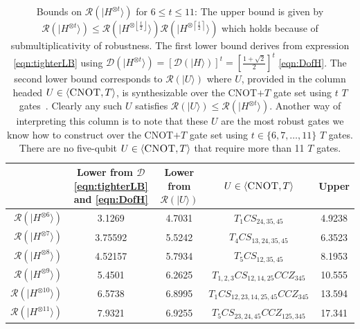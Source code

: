 \documentclass[aps,prl,twocolumn,showpacs,superscriptaddress,groupedaddress,amsmath,amssymb]{revtex4-1}  %
\def\ket #1{\vert #1\rangle}
\begin{document}
\begin{table}[t]
\centering
\begin{tabular}{rcccc}
\hline
 &\hspace{0.25cm} Lower from $\mathcal{D}$ \eqref{eqn:tighterLB} and \eqref{eqn:DofH} \hspace{0.25cm} &  Lower from $\mathcal{R}(\ket{U})$  & $U\in\langle \textsc{CNOT}, T\rangle$ & Upper  \\
\hline
$\mathcal{R}(\ket{H^{\otimes 6}})$ \quad & 3.1269 & 4.7031 & $T_1CS_{24,35,45}$ & 4.9238\\
$\mathcal{R}(\ket{H^{\otimes 7}})$ \quad  & 3.75592 & 5.5242 & $T_4CS_{13,24,35,45}$ & 6.3523  \\
$\mathcal{R}(\ket{H^{\otimes 8}})$ \quad  & 4.52157 & 5.7934 & $T_5CS_{12,35,45}$ & 8.1953 \\
$\mathcal{R}(\ket{H^{\otimes 9}})$ \quad  & 5.4501 & 6.2625 & $T_{1,2,3}CS_{12,14,25}CCZ_{345}$            & 10.555 \\
$\mathcal{R}(\ket{H^{\otimes 10}})$ \quad  & 6.5738 & 6.8995 & $T_{1}CS_{12,23,14,25,45}CCZ_{345}$              & 13.594 \\
$\mathcal{R}(\ket{H^{\otimes 11}})$ \quad  & 7.9321 & 6.9255 & $T_5CS_{23,24,45}CCZ_{125,345}$              & 17.341 \\
\hline
\end{tabular}
\caption{\label{Tab:bounds_on_Rob} Bounds on $\mathcal{R}(\ket{H^{\otimes t}})$ for $6\leq t \leq 11$: The upper bound is given by $\mathcal{R}(\ket{H^{\otimes t}})\leq \mathcal{R}(\ket{H^{\otimes \left \lfloor{\tfrac{t}{2}}\right \rfloor}})\mathcal{R}(\ket{H^{\otimes \left \lceil{\tfrac{t}{2}}\right \rceil}})$ which holds because of submultiplicativity of robustness. The first lower bound derives from expression \eqref{eqn:tighterLB} using $\mathcal{D}(\ket{H^{\otimes t}})=\left[\mathcal{D}(\ket{H})\right]^{ t}=\left[\frac{1+\sqrt{2}}{2}\right]^t$ \eqref{eqn:DofH}. The second lower bound corresponds to $\mathcal{R}(\ket{U})$ where $U$, provided in the column headed $U\in\langle \textsc{CNOT}, T\rangle$, is synthesizable over the CNOT$+T$ gate set using $t$ $T$ gates~\cite{amy_t-count_2016}. Clearly any such $U$ satisfies $\mathcal{R}(\ket{U}) \leq \mathcal{R}(\ket{H^{\otimes t}}) $. Another way of interpreting this column is to note that these $U$ are the most robust gates we know how to construct over the CNOT$+T$ gate set using $t\in\{6,7,\ldots,11\}$ $T$ gates. There are no five-qubit $U\in\langle \textsc{CNOT}, T\rangle$ that require more than 11 $T$ gates.}
\end{table}
\end{document}

